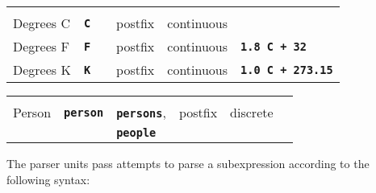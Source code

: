 \documentclass[12pt]{article}
\newcommand{\TT}[1]{{\tt \bfseries #1}}
\begin{document}
\hspace*{0.2in}\begin{tabular}{llllll}
\hspace*{1.0in} & \hspace*{0.8in} & \hspace*{0.8in} & \hspace*{0.4in} &
                  \hspace*{0.7in} \\[-2ex]
Degrees C\BU	& \TT{C} & & postfix & continuous \\
Degrees F	& \TT{F} & & postfix & continuous & \TT{1.8 C + 32} \\
Degrees K	& \TT{K} & & postfix & continuous & \TT{1.0 C + 273.15} \\
\end{tabular}

\hspace*{0.2in}\begin{tabular}{llllll}
\hspace*{1.0in} & \hspace*{0.8in} & \hspace*{0.8in} & \hspace*{0.4in} &
                  \hspace*{0.7in} \\[-2ex]
Person		& \TT{person} & \TT{persons}, & postfix & discrete \\
		&	  & \TT{people} \\ 
\end{tabular}

The parser units pass attempts to parse a subexpression according to the
following syntax:
\end{document}
